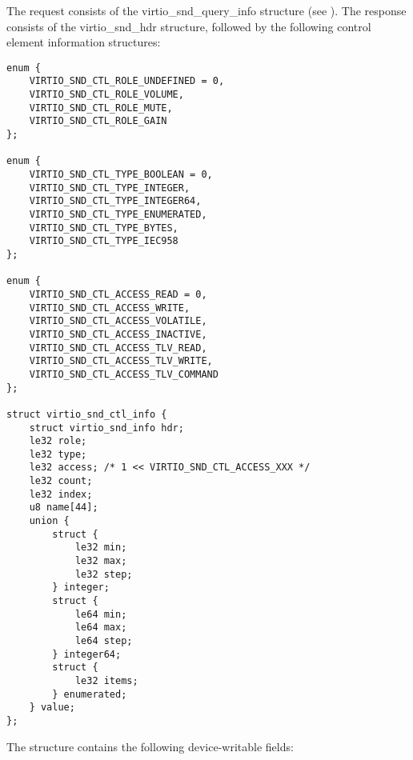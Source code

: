 The request consists of the virtio_snd_query_info structure
(see ).
The response consists of the virtio_snd_hdr structure, followed by the following
control element information structures:

\begin{lstlisting}
enum {
    VIRTIO_SND_CTL_ROLE_UNDEFINED = 0,
    VIRTIO_SND_CTL_ROLE_VOLUME,
    VIRTIO_SND_CTL_ROLE_MUTE,
    VIRTIO_SND_CTL_ROLE_GAIN
};

enum {
    VIRTIO_SND_CTL_TYPE_BOOLEAN = 0,
    VIRTIO_SND_CTL_TYPE_INTEGER,
    VIRTIO_SND_CTL_TYPE_INTEGER64,
    VIRTIO_SND_CTL_TYPE_ENUMERATED,
    VIRTIO_SND_CTL_TYPE_BYTES,
    VIRTIO_SND_CTL_TYPE_IEC958
};

enum {
    VIRTIO_SND_CTL_ACCESS_READ = 0,
    VIRTIO_SND_CTL_ACCESS_WRITE,
    VIRTIO_SND_CTL_ACCESS_VOLATILE,
    VIRTIO_SND_CTL_ACCESS_INACTIVE,
    VIRTIO_SND_CTL_ACCESS_TLV_READ,
    VIRTIO_SND_CTL_ACCESS_TLV_WRITE,
    VIRTIO_SND_CTL_ACCESS_TLV_COMMAND
};

struct virtio_snd_ctl_info {
    struct virtio_snd_info hdr;
    le32 role;
    le32 type;
    le32 access; /* 1 << VIRTIO_SND_CTL_ACCESS_XXX */
    le32 count;
    le32 index;
    u8 name[44];
    union {
        struct {
            le32 min;
            le32 max;
            le32 step;
        } integer;
        struct {
            le64 min;
            le64 max;
            le64 step;
        } integer64;
        struct {
            le32 items;
        } enumerated;
    } value;
};
\end{lstlisting}

The structure contains the following device-writable fields:

